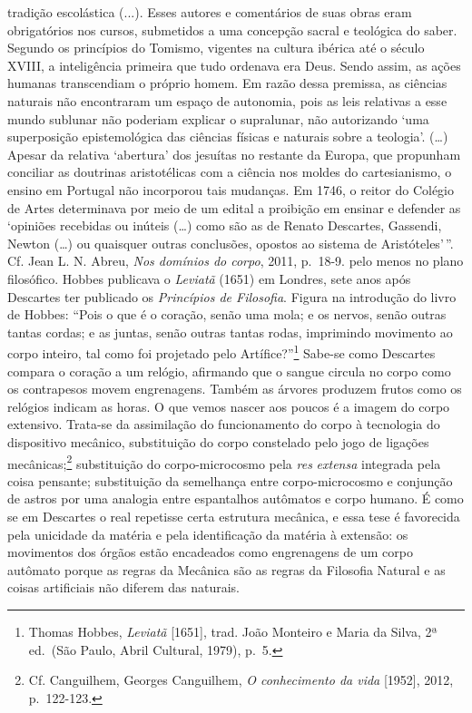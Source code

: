 {  tradição escolástica (...). Esses autores e comentários de suas obras
  eram obrigatórios nos cursos, submetidos a uma concepção sacral e
  teológica do saber. Segundo os princípios do Tomismo, vigentes na
  cultura ibérica até o século XVIII, a inteligência primeira que tudo
  ordenava era Deus. Sendo assim, as ações humanas transcendiam o
  próprio homem. Em razão dessa premissa, as ciências naturais não
  encontraram um espaço de autonomia, pois as leis relativas a esse
  mundo sublunar não poderiam explicar o supralunar, não autorizando
  `uma superposição epistemológica das ciências físicas e naturais sobre
  a teologia'. (\ldots{}) Apesar da relativa `abertura' dos jesuítas no
  restante da Europa, que propunham conciliar as doutrinas aristotélicas
  com a ciência nos moldes do cartesianismo, o ensino em Portugal não
  incorporou tais mudanças. Em 1746, o reitor do Colégio de Artes
  determinava por meio de um edital a proibição em ensinar e defender as
  `opiniões recebidas ou inúteis (\ldots{}) como são as de Renato
  Descartes, Gassendi, Newton (\ldots{}) ou quaisquer outras conclusões,
  opostos ao sistema de Aristóteles'\,''. Cf. Jean L. N. Abreu,
  \emph{Nos domínios do corpo}, 2011, p.~18-9.} pelo menos no plano
filosófico. Hobbes publicava o \emph{Leviatã} (1651) em Londres, sete
anos após Descartes ter publicado os \emph{Princípios de Filosofia}.
Figura na introdução do livro de Hobbes: ``Pois o que é o coração, senão
uma mola; e os nervos, senão outras tantas cordas; e as juntas, senão
outras tantas rodas, imprimindo movimento ao corpo inteiro, tal como foi
projetado pelo Artífice?''\footnote{Thomas Hobbes, \emph{Leviatã}
  {[}1651{]}, trad. João Monteiro e Maria da Silva, 2ª ed.~(São Paulo,
  Abril Cultural, 1979), p.~5.} Sabe-se como Descartes compara o coração
a um relógio, afirmando que o sangue circula no corpo como os
contrapesos movem engrenagens. Também as árvores produzem frutos como os
relógios indicam as horas. O que vemos nascer aos poucos é a imagem do
corpo extensivo. Trata-se da assimilação do funcionamento do corpo à
tecnologia do dispositivo mecânico, substituição do corpo constelado
pelo jogo de ligações mecânicas;\footnote{Cf. Canguilhem, Georges
  Canguilhem, \emph{O conhecimento da vida} {[}1952{]}, 2012,
  p.~122-123.} substituição do corpo-microcosmo pela \emph{res}
\emph{extensa} integrada pela coisa pensante; substituição da semelhança
entre corpo-microcosmo e conjunção de astros por uma analogia entre
espantalhos autômatos e corpo humano. É como se em Descartes o real
repetisse certa estrutura mecânica, e essa tese é favorecida pela
unicidade da matéria e pela identificação da matéria à extensão: os
movimentos dos órgãos estão encadeados como engrenagens de um corpo
autômato porque as regras da Mecânica são as regras da Filosofia Natural
e as coisas artificiais não diferem das naturais.

